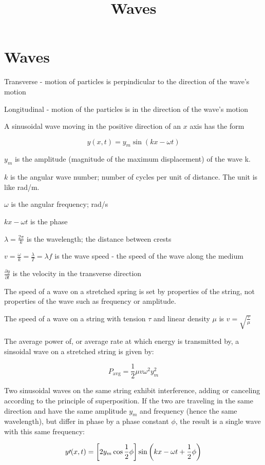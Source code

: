 \documentclass{article}
\title{Waves}
\begin{document}
\section{Waves}

Transverse - motion of particles is perpindicular to the direction of the wave's motion

Longitudinal - motion of the particles is in the direction of the wave's motion

A sinusoidal wave moving in the positive direction of an $x$ axis has the form

\[ y(x,t) = y_m \sin(kx - \omega t) \]

$y_m$ is the amplitude (magnitude of the maximum displacement) of the wave k. 

$k$ is the angular wave number; number of cycles per unit of distance. The unit is like rad/m.

$\omega$ is the angular frequency; rad/s

$kx - \omega t$ is the phase

$ \lambda = \frac{2\pi}{k}$ is the wavelength; the distance between crests

$v = \frac{\omega}{k} = \frac{\lambda}{T} = \lambda f$ is the wave speed - the speed of the wave along the medium

$\frac{\partial y}{\partial t}$ is the velocity in the transverse direction

The speed of a wave on a stretched spring is set by properties of the string, not properties of the wave such as frequency or amplitude.

The speed of a wave on a string with tension $\tau$ and linear density $\mu$ is $v = \sqrt{\frac{\tau}{\mu}}$

The average power of, or average rate at which energy is transmitted by, a sinsoidal wave on a stretched string is given by:

\[ P_{\text{avg}} = \frac{1}{2} \mu v \omega^2 {y^2_m} \] 

Two sinusoidal waves on the same string exhibit interference, adding or canceling according to the principle of superposition. If the two are traveling in the same direction and have the same amplitude $y_m$ and frequency (hence the same wavelength), but differ in phase by a phase constant $\phi$, the result is a single wave with this same frequency:

\[ y\prime (x,t) = \left[2y_m \cos{\frac{1}{2}\phi}\right] \sin{\left(kx -\omega t + \frac{1}{2} \phi\right)} \]
\end{document}

